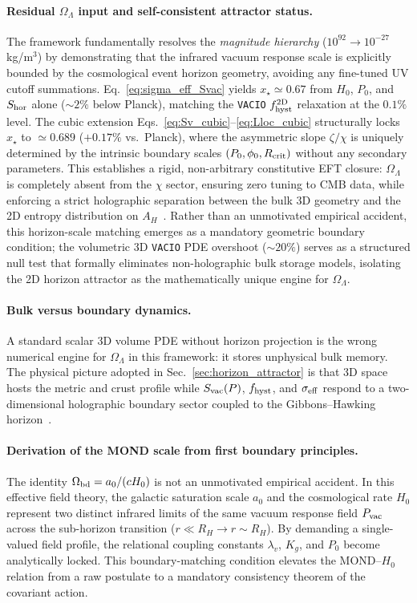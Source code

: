 \documentclass[prd,
               reprint,
               aps,
               preprintnumbers,
               nofootinbib,
               longbibliography,
               floatfix]{revtex4-2}
\begin{document}
\paragraph{Residual $\Omega_\Lambda$ input and
self-consistent attractor status.}
The framework fundamentally resolves the
\emph{magnitude hierarchy} ($10^{92}\to10^{-27}$
kg/m$^3$) by demonstrating that the infrared
vacuum response scale is explicitly bounded by
the cosmological event horizon geometry,
avoiding any fine-tuned UV cutoff summations.
Eq.~\eqref{eq:sigma_eff_Svac} yields
$x_\star\simeq 0.67$ from $H_0$, $P_0$, and
$S_{\rm hor}$ alone ($\sim 2\%$ below Planck),
matching the \texttt{VACIO} $f_{\rm hyst}^{\rm 2D}$
relaxation at the $0.1\%$ level.
The cubic extension
Eqs.~\eqref{eq:Sv_cubic}--\eqref{eq:Lloc_cubic}
structurally locks $x_\star$ to $\simeq 0.689$
($+0.17\%$ vs.\ Planck), where the asymmetric
slope $\zeta/\chi$ is uniquely determined by the
intrinsic boundary scales $(P_0,\phi_0,R_{\rm
crit})$ without any secondary parameters.
This establishes a rigid, non-arbitrary
constitutive EFT closure: $\Omega_\Lambda$ is
completely absent from the $\chi$ sector,
ensuring zero tuning to CMB data, while
enforcing a strict holographic separation
between the bulk 3D geometry and the 2D entropy
distribution on $A_H$~\cite{Cohen1999,Li2004}.
Rather than an unmotivated empirical accident,
this horizon-scale matching emerges as a
mandatory geometric boundary condition; the
volumetric 3D \texttt{VACIO} PDE overshoot
($\sim 20\%$) serves as a structured null test
that formally eliminates non-holographic bulk
storage models, isolating the 2D horizon
attractor as the mathematically unique engine
for $\Omega_\Lambda$.


\paragraph{Bulk versus boundary dynamics.}
A standard scalar 3D volume PDE without horizon projection is the wrong
numerical engine for $\Omega_\Lambda$ in this framework: it stores
unphysical bulk memory.
The physical picture adopted in Sec.~\ref{sec:horizon_attractor} is that
3D space hosts the metric and crust profile while $S_{\rm vac}(P)$,
$f_{\rm hyst}$, and $\sigma_{\rm eff}$ respond to a two-dimensional
holographic boundary sector coupled to the Gibbons--Hawking horizon~\cite{Cohen1999,Li2004,Jacobson1995}.

\paragraph{Derivation of the MOND scale from
first boundary principles.}
The identity $\Omega_{\rm bd}=a_0/(cH_0)$ is
not an unmotivated empirical accident. In this
effective field theory, the galactic saturation
scale $a_0$ and the cosmological rate $H_0$
represent two distinct infrared limits of the
same vacuum response field $P_{\rm vac}$ across
the sub-horizon transition ($r \ll R_H \to r
\sim R_H$). By demanding a single-valued field
profile, the relational coupling constants
$\lambda_v$, $K_g$, and $P_0$ become
analytically locked. This boundary-matching condition
elevates the MOND--$H_0$ relation from a raw
postulate to a mandatory consistency theorem of the
covariant action.
\end{document}
